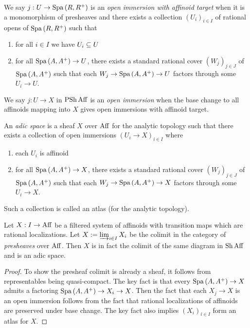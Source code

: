 \documentclass{article}
\begin{document}
\begin{dfn}

  We say $j : U \to \mathrm{Spa}\,(R , R^+)$ is an \emph{open immersion
  with affinoid target} when
  it is a monomorphism of presheaves
  and there exists a collection $(U_i)_{i\in I}$ of rational opens
  of $\mathrm{Spa}\,(R , R^+)$ such that 
  \begin{enumerate}
    \item for all $i\in I$ we have $U_i \subseteq U$
    \item for all $\mathrm{Spa}\, (A , A^+) \to U$,
    there exists a standard rational cover $(W_j)_{j \in J}$ 
    of $\mathrm{Spa}\,(A , A^+)$ such that each $W_j \to \mathrm{Spa}\,(A , A^+) \to U$ 
    factors through some $U_i \to U$.
  \end{enumerate}

  We say $j : U \to X$ in $\operatorname{PSh} \mathrm{Aff}$ is an \emph{open immersion}
  when the base change to all affinoids mapping into $X$ gives
  open immersions with affinoid target.

  An \emph{adic space} is a sheaf $X$ over $\mathrm{Aff}$ for the analytic topology
  such that there exists a collection of open immersions $(U_i \to X)_{i \in I}$
  where \begin{enumerate}
    \item each $U_i$ is affinoid
    \item for all $\mathrm{Spa}\,(A , A^+) \to X$,
    there exists a standard rational cover $(W_j)_{j \in J}$ of $\mathrm{Spa}\,(A , A^+)$
    such that each $W_j \to \mathrm{Spa}\,(A , A^+) \to X$ factors through some
    $U_i \to X$.
  \end{enumerate}
  Such a collection is called an atlas (for the analytic topology).
\end{dfn}
\begin{prop}
  
  Let $X : I \to \mathrm{Aff}$ be a filtered system of affinoids
  with transition maps which are rational localizations.
  Let $X := \varinjlim_{i \in I} X_i$ be the colimit
  in the category of \emph{presheaves} over $\mathrm{Aff}$.
  Then $X$ is in fact the colimit of the same diagram
  in $\operatorname{Sh} \mathrm{Aff}$ and is an adic space.
\end{prop}
\begin{proof}
  To show the presheaf colimit is already a sheaf,
  it follows from representables being quasi-compact.
  The key fact is that 
  every $\mathrm{Spa}\, (A , A^+) \to X$ admits a factoring $\mathrm{Spa}\,(A , A^+) \to X_i \to X$.
  Then the fact that each $X_j \to X$ is an open immersion follows from
  the fact that rational localizations of affinoids
  are preserved under base change.
  The key fact also implies $(X_i)_{i \in I}$ form an atlas for $X$.
\end{proof}
\end{document}
